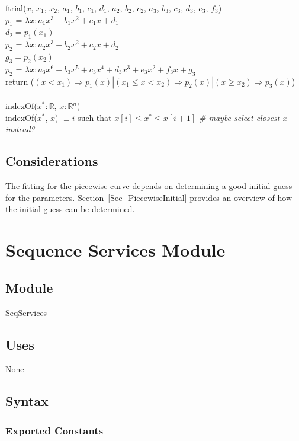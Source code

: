 \documentclass[12pt, titlepage]{article}
\begin{document}
\noindent ftrial($x$, $x_1$, $x_2$, $a_1$, $b_1$, $c_1$, $d_1$, $a_2$, $b_2$,
$c_2$, $a_3$, $b_3$, $c_3$, $d_3$, $e_3$, $f_3$)\\
$p_1$ = $\lambda x : a_1 x^3 + b_1 x^2 + c_1 x + d_1$\\
$d_2 = p_1(x_1)$\\
$p_2$ = $\lambda x : a_2 x^3 + b_2 x^2 + c_2 x + d_2$\\
$g_3 = p_2(x_2)$\\
$p_2$ = $\lambda x : a_3 x^6 + b_3 x^5 + c_3 x^4 + d_3 x^3  + e_3 x^2 + f_3 x +
g_3$\\
return ($(x<x_1) \Rightarrow p_1(x) | (x_1 \leq x < x_2) \Rightarrow p_2(x) | (x \geq
x_2) \Rightarrow p_3(x)$)\\
~\\
\noindent indexOf($x^*:\mathbb{R}$, $x: \mathbb{R}^n$)\\
indexOf($x^*$, $x$) $\equiv i$ such that $x[i] \leq x^* \leq x[i+1]$ \emph{\#
  maybe select closest $x$ instead?}

\subsection*{Considerations}

The fitting for the piecewise curve depends on determining a good initial guess
for the parameters.  Section~\ref{Sec_PiecewiseInitial} provides an overview of
how the initial guess can be determined.

\newpage

\section* {Sequence Services Module}

\subsection* {Module}

SeqServices

\subsection* {Uses}

None

\subsection* {Syntax}

\subsubsection* {Exported Constants}
\end{document}
